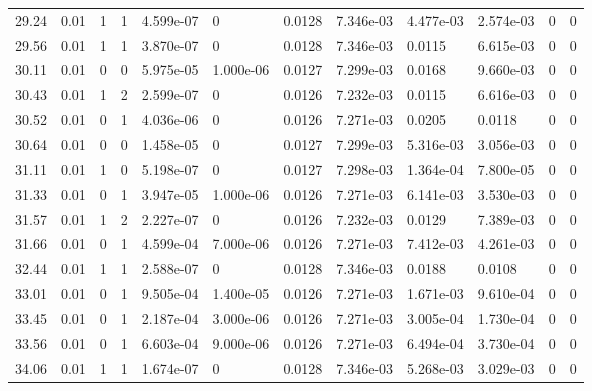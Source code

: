 \documentclass[preview]{standalone}
\begin{document}
{{{\begin{tabular}{L{1.2cm}C{1.2cm} C{0.3cm}C{0.5cm} C{1.4cm}C{1.4cm} C{1.4cm}C{1.4cm} C{1.6cm}C{1.6cm} C{1.6cm}C{1.6cm}}
  29.24  &  0.01  & 1     &  1 &  4.599e-07  & 0  &  0.0128&   7.346e-03& 4.477e-03 & 2.574e-03   &  0 & 0  \\ 
  29.56  &  0.01  & 1     &  1 &  3.870e-07  & 0  &  0.0128&   7.346e-03& 0.0115 & 6.615e-03   &  0 & 0  \\ 
  30.11  &  0.01  & 0     &  0 &  5.975e-05  & 1.000e-06  &  0.0127&   7.299e-03& 0.0168 & 9.660e-03   &  0 & 0  \\ 
  30.43  &  0.01  & 1     &  2 &  2.599e-07  & 0  &  0.0126&   7.232e-03& 0.0115 & 6.616e-03   &  0 & 0  \\ 
  30.52  &  0.01  & 0     &  1 &  4.036e-06  & 0  &  0.0126&   7.271e-03& 0.0205 & 0.0118   &  0 & 0  \\ 
  30.64  &  0.01  & 0     &  0 &  1.458e-05  & 0  &  0.0127&   7.299e-03& 5.316e-03 & 3.056e-03   &  0 & 0  \\ 
  31.11  &  0.01  & 1     &  0 &  5.198e-07  & 0  &  0.0127&   7.298e-03& 1.364e-04 & 7.800e-05   &  0 & 0  \\ 
  31.33  &  0.01  & 0     &  1 &  3.947e-05  & 1.000e-06  &  0.0126&   7.271e-03& 6.141e-03 & 3.530e-03   &  0 & 0  \\ 
  31.57  &  0.01  & 1     &  2 &  2.227e-07  & 0  &  0.0126&   7.232e-03& 0.0129 & 7.389e-03   &  0 & 0  \\ 
  31.66  &  0.01  & 0     &  1 &  4.599e-04  & 7.000e-06  &  0.0126&   7.271e-03& 7.412e-03 & 4.261e-03   &  0 & 0  \\ 
  32.44  &  0.01  & 1     &  1 &  2.588e-07  & 0  &  0.0128&   7.346e-03& 0.0188 & 0.0108   &  0 & 0  \\ 
  33.01  &  0.01  & 0     &  1 &  9.505e-04  & 1.400e-05  &  0.0126&   7.271e-03& 1.671e-03 & 9.610e-04   &  0 & 0  \\ 
  33.45  &  0.01  & 0     &  1 &  2.187e-04  & 3.000e-06  &  0.0126&   7.271e-03& 3.005e-04 & 1.730e-04   &  0 & 0  \\ 
  33.56  &  0.01  & 0     &  1 &  6.603e-04  & 9.000e-06  &  0.0126&   7.271e-03& 6.494e-04 & 3.730e-04   &  0 & 0  \\ 
  34.06  &  0.01  & 1     &  1 &  1.674e-07  & 0  &  0.0128&   7.346e-03& 5.268e-03 & 3.029e-03   &  0 & 0  \\ 
\hline 
\end{tabular} 

}}}
\end{document}
